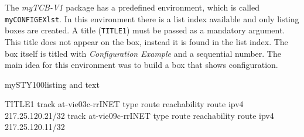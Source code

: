 \documentclass[]{myHOWTO-V001}
\begin{document}
The \emph{myTCB-V1} package has a predefined environment, which is called \Verb|myCONFIGEXlst|. In this environment there is a list index available and only listing boxes are created. A title (\verb|TITLE1|) must be passed as a mandatory argument. This title does not appear on the box, instead it is found in the list index. The box itself is titled with \emph{Configuration Example} and a sequential number. The main idea for this environment was to build a box that shows configuration.

\begin{myTEXEXdoclst}{mySTY100}{listing and text}
\begin{myCONFIGEXlst}{TITLE1}{}
track at-vie03c-rrINET type route reachability route ipv4 217.25.120.21/32
track at-vie09c-rrINET type route reachability route ipv4 217.25.120.11/32
\end{myCONFIGEXlst}
\end{myTEXEXdoclst}
\end{document}
